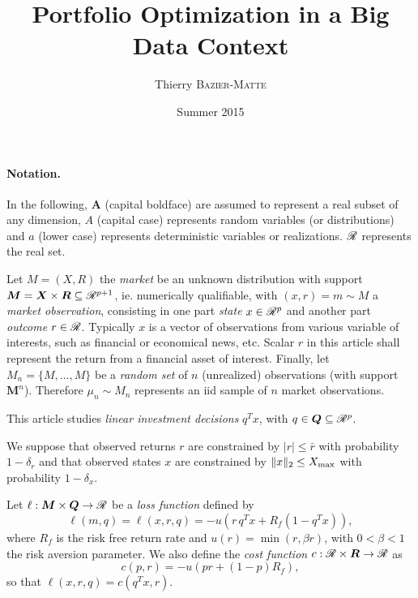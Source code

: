 \documentclass[11pt]{article}
\title{Portfolio Optimization in a Big Data Context}
\author{Thierry \textsc{Bazier-Matte}}
\date{Summer 2015}
\begin{document}
\maketitle

\paragraph{Notation.}
In the following, $\bm A$ (capital boldface) are assumed to represent a real subset of any
dimension, $A$ (capital case) represents random variables (or distributions) and $a$
(lower case) represents deterministic variables or realizations. $\mathscr{R}$ represents the
real set.

Let $M=(X,R)$ the \textsl{market} be an unknown distribution with support
$\bm M = \bm X\times \bm R \subseteq\mathscr{R}^{p+1}$, ie. numerically qualifiable, with
$(x,r) = m\sim M$ a \textsl{market observation}, consisting in one part \textsl{state}
$x\in\mathscr{R}^p$ and another part \textsl{outcome} $r\in\mathscr{R}$. Typically $x$ is a vector of
observations from various variable of interests, such as financial or economical news,
etc. Scalar $r$ in this article shall represent the return from a financial asset of
interest. Finally, let $M_n = \{M,\dots,M\}$ be a \textsl{random set} of $n$ (unrealized)
observations (with support $\bm M^n$). Therefore $\mu_n \sim M_n$ represents an iid sample
of $n$ market observations.

This article studies \textsl{linear investment decisions} $q^Tx$, with
$q\in \bm Q\subseteq\mathscr{R}^p$.

\begin{assumption}
  We suppose that observed returns $r$ are constrained by $|r| \leq \bar r$ with
  probability $1-\delta_r$ and that observed states $x$ are constrained by
  $\|x\|_2 \leq X_{\max}$ with probability $1-\delta_x$.
\end{assumption}

\begin{deff}
  Let $\ell:\bm M\times \bm Q\to\mathscr{R}$ be a \textsl{loss function} defined by
  \begin{equation*}
    \ell(m,q) = \ell(x,r,q) = -u(r\,q^{T}x + R_f (1 - q^{T}x)),
  \end{equation*}
  where $R_f$ is the risk free return rate and $u(r) = \min(r,\beta r)$, with $0<\beta<1$
  the risk aversion parameter. We also define the \textsl{cost function}
  $c:\mathscr{R}\times\bm R\to\mathscr{R}$ as
  \begin{equation*}
    c(p,r) = -u(pr + (1-p)R_f),
  \end{equation*}
  so that $\ell(x,r,q) = c(q^Tx,r)$. 
\end{deff}
\end{document}
